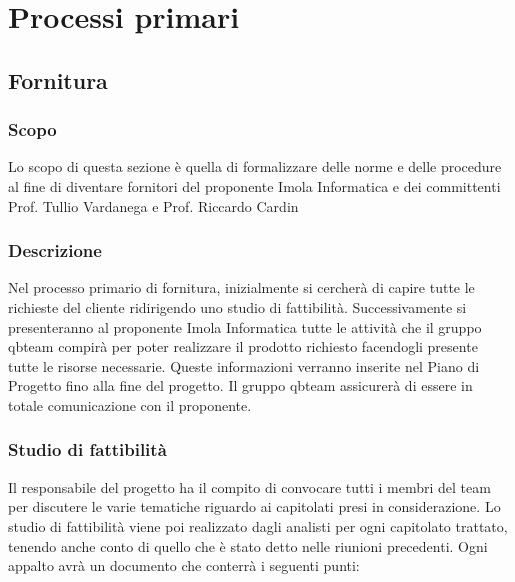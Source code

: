 \section{Processi primari}
\subsection{Fornitura}
\subsubsection{Scopo}
Lo scopo di questa sezione è quella di formalizzare delle norme e delle procedure al fine di diventare fornitori del proponente Imola Informatica e dei committenti Prof. Tullio Vardanega e Prof. Riccardo Cardin 


\subsubsection{Descrizione} 
Nel processo primario di fornitura, inizialmente si cercherà di capire tutte le richieste del cliente ridirigendo uno studio di fattibilità. 
Successivamente si presenteranno al proponente Imola Informatica tutte le attività che il gruppo qbteam compirà per poter realizzare il prodotto richiesto facendogli presente tutte le risorse necessarie. Queste informazioni verranno inserite nel Piano di Progetto fino alla fine del progetto.
Il gruppo qbteam assicurerà di essere in totale comunicazione con il proponente.


\subsubsection{Studio di fattibilità}

Il responsabile del progetto ha il compito di convocare tutti i membri del team per discutere le varie tematiche riguardo ai capitolati presi in considerazione.
Lo studio di fattibilità viene poi realizzato dagli analisti per ogni capitolato trattato, tenendo anche conto di quello che è stato detto nelle riunioni precedenti. Ogni appalto avrà un documento che conterrà i seguenti punti:

